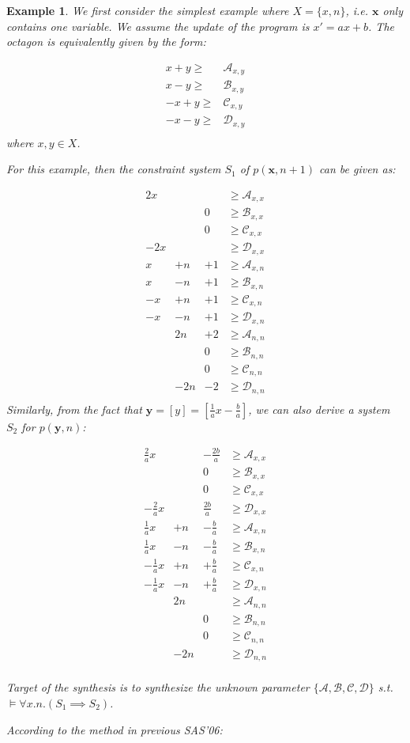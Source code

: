 \documentclass[a4paper,12pt]{article}
\newtheorem{example}{Example}
\newcommand{\cona}{\mathcal{A}}
\newcommand{\conb}{\mathcal{B}}
\newcommand{\conc}{\mathcal{C}}
\newcommand{\cond}{\mathcal{D}}
\begin{document}
\begin{example}

We first consider the simplest example where $X = \{x, n\}$, i.e. $\mathbf{x}$ only contains one variable. We assume the update of the program is $x' = ax + b$. The octagon is equivalently given by the form:


\begin{align*}
x + y \ge& \cona_{x,y}\\
x - y \ge& \conb_{x,y}\\
-x + y \ge& \conc_{x,y}\\
-x - y \ge& \cond_{x,y}\\
\end{align*}
where $x,y\in X$.

For this example, then the constraint system $S_1$ of $p(\mathbf{x}, n+1)$ can be given as:

\begin{align*}
2x&& &\ge \cona_{x,x}\\
&&0 &\ge \conb_{x,x}\\
&&0 &\ge \conc_{x,x}\\
-2x&& & \ge \cond_{x,x}\\
x &+ n& +1&\ge \cona_{x,n}\\
x &- n& +1&\ge \conb_{x,n}\\
-x &+ n& +1&\ge \conc_{x,n}\\
-x &- n&+1 &\ge \cond_{x,n}\\
&2n & +2&\ge \cona_{n,n}\\
&& 0&\ge \conb_{n,n}\\
&& 0&\ge \conc_{n,n}\\
&-2n& -2&\ge\cond_{n,n}\\
\end{align*}
Similarly, from the fact that $\mathbf{y} = [y] = [\frac{1}{a} x - \frac{b}{a}]$, we can also derive a system $S_2$ for $p(\mathbf{y}, n)$:

\begin{align*}
\frac{2}{a}x&& -\frac{2b}{a} &\ge \cona_{x,x}\\
&&0 &\ge \conb_{x,x}\\
&&0 &\ge \conc_{x,x}\\
-\frac{2}{a}x&& \frac{2b}{a} &\ge \cond_{x,x}\\
\frac{1}{a}x &+ n& -\frac{b}{a}&\ge \cona_{x,n}\\
\frac{1}{a}x &- n& -\frac{b}{a}&\ge \conb_{x,n}\\
-\frac{1}{a}x &+ n& +\frac{b}{a}&\ge \conc_{x,n}\\
-\frac{1}{a}x &- n& +\frac{b}{a}&\ge \cond_{x,n}\\
&2n &&\ge \cona_{n,n}\\
&& 0&\ge \conb_{n,n}\\
&& 0&\ge \conc_{n,n}\\
&-2n&&\ge\cond_{n,n}\\
\end{align*}

Target of the synthesis is to synthesize the unknown parameter $\{\cona, \conb, \conc, \cond\}$ s.t. $\models \forall x.n. (S_1\implies S_2)$.

According to the method in previous SAS'06:
\end{example}
\end{document}

